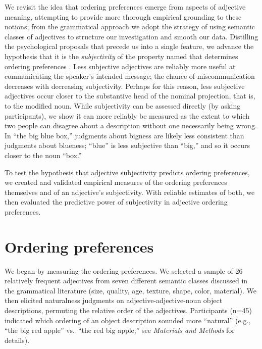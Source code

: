 \documentclass{pnastwo}
\begin{document}
\begin{article}
We revisit the idea that ordering preferences emerge from aspects of adjective meaning, attempting to provide more thorough empirical grounding to these notions;
from the grammatical approach we adopt the strategy of using semantic classes of adjectives to structure our investigation and smooth our data. 
Distilling the psychological proposals that precede us into a single feature, we advance the hypothesis that it is the \emph{subjectivity} of the property named that determines ordering preferences \cite{hetzron1978,quirketal1985,hill2012}.
Less subjective adjectives are reliably more useful at communicating the speaker's intended message; the chance of miscommunication decreases with decreasing subjectivity. 
Perhaps for this reason, less subjective adjectives occur closer to the substantive head of the nominal projection, that is, to the modified noun.  
While subjectivity can be assessed directly (by asking participants), we show it can more reliably be measured as the extent to which two people can disagree about a description without one necessarily being wrong. 
 In ``the big blue box,'' judgments about bigness are likely less consistent than judgments about blueness; ``blue'' is less subjective than ``big,'' and so it occurs closer to the noun ``box.''

To test the hypothesis that adjective subjectivity predicts ordering preferences, we created and validated empirical measures of the ordering preferences themselves and of an adjective's subjectivity. With reliable estimates of both, we then evaluated the predictive power of subjectivity in adjective ordering preferences.

\section{Ordering preferences}

We began by measuring the ordering preferences. We selected a sample of 26 relatively frequent adjectives from seven different semantic classes discussed in the grammatical literature (size, quality, age, texture, shape, color, material). We then elicited naturalness judgments on adjective-adjective-noun object descriptions, permuting the relative order of the adjectives. Participants (n=45) indicated which ordering of an object description sounded more ``natural'' (e.g., ``the big red apple'' vs.\ ``the red big apple;'' see \emph{Materials and Methods} for details).


\end{article}
\end{document}
